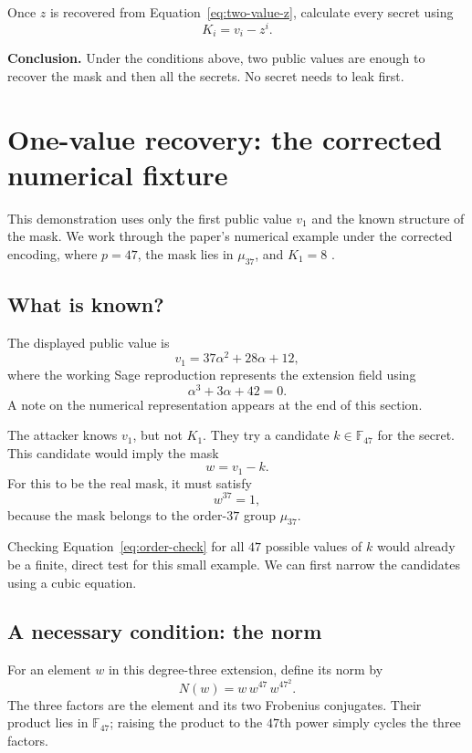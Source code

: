 \documentclass[11pt]{article}
\begin{document}
Once $z$ is recovered from Equation~\eqref{eq:two-value-z}, calculate every secret using
\[
    \boxed{K_i=v_i-z^i.}
\]

\textbf{Conclusion.} Under the conditions above, two public values are enough to recover the mask and then all the secrets. No secret needs to leak first.

\section{One-value recovery: the corrected numerical fixture}

This demonstration uses only the first public value $v_1$ and the known structure of the mask. We work through the paper's numerical example under the corrected encoding, where $p=47$, the mask lies in $\mu_{37}$, and $K_1=8$ \cite[Sec.~5, pp.~1462--1463]{chintamani2024}.

\subsection{What is known?}

The displayed public value is
\[
    v_1=37\alpha^2+28\alpha+12,
\]
where the working Sage reproduction represents the extension field using
\[
    \alpha^3+3\alpha+42=0.
\]
A note on the numerical representation appears at the end of this section.

The attacker knows $v_1$, but not $K_1$. They try a candidate $k\in\mathbb F_{47}$ for the secret. This candidate would imply the mask
\[
    w=v_1-k.
\]
For this to be the real mask, it must satisfy
\begin{equation}
    w^{37}=1,
    \label{eq:order-check}
\end{equation}
because the mask belongs to the order-$37$ group $\mu_{37}$.

Checking Equation~\eqref{eq:order-check} for all $47$ possible values of $k$ would already be a finite, direct test for this small example. We can first narrow the candidates using a cubic equation.

\subsection{A necessary condition: the norm}

For an element $w$ in this degree-three extension, define its norm by
\[
    N(w)=w\,w^{47}\,w^{47^2}.
\]
The three factors are the element and its two Frobenius conjugates. Their product lies in $\mathbb F_{47}$; raising the product to the $47$th power simply cycles the three factors.
\end{document}
